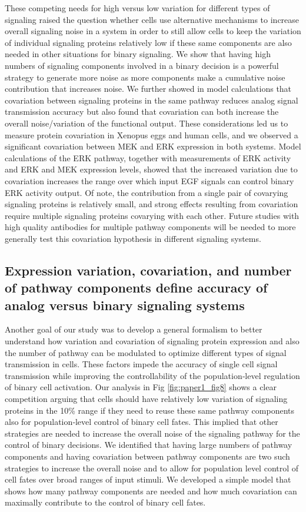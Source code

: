 These competing needs for high versus low variation for different types of signaling raised the question whether cells use alternative mechanisms to increase overall signaling noise in a system in order to still allow cells to keep the variation of individual signaling proteins relatively low if these same components are also needed in other situations for binary signaling. We show that having high numbers of signaling components involved in a binary decision is a powerful strategy to generate more noise as more components make a cumulative noise contribution that increases noise. We further showed in model calculations that covariation between signaling proteins in the same pathway reduces analog signal transmission accuracy but also found that covariation can both increase the overall noise/variation of the functional output. These considerations led us to measure protein covariation in Xenopus eggs and human cells, and we observed a significant covariation between MEK and ERK expression in both systems. Model calculations of the ERK pathway, together with measurements of ERK activity and ERK and MEK expression levels, showed that the increased variation due to covariation increases the range over which input EGF signals can control binary ERK activity output. Of note, the contribution from a single pair of covarying signaling proteins is relatively small, and strong effects resulting from covariation require multiple signaling proteins covarying with each other. Future studies with high quality antibodies for multiple pathway components will be needed to more generally test this covariation hypothesis in different signaling systems.

\subsection{Expression variation, covariation, and number of pathway components define accuracy of analog versus binary signaling systems}

Another goal of our study was to develop a general formalism to better understand how variation and covariation of signaling protein expression and also the number of pathway can be modulated to optimize different types of signal transmission in cells. These factors impede the accuracy of single cell signal transmission while improving the controllability of the population‐level regulation of binary cell activation. Our analysis in Fig \ref{fig:paper1_fig8} shows a clear competition arguing that cells should have relatively low variation of signaling proteins in the 10\% range if they need to reuse these same pathway components also for population‐level control of binary cell fates. This implied that other strategies are needed to increase the overall noise of the signaling pathway for the control of binary decisions. We identified that having large numbers of pathway components and having covariation between pathway components are two such strategies to increase the overall noise and to allow for population level control of cell fates over broad ranges of input stimuli. We developed a simple model that shows how many pathway components are needed and how much covariation can maximally contribute to the control of binary cell fates.

